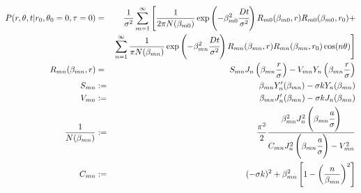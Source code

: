 \documentclass{article}
\begin{document}
\begin{eqnarray}
    P(r, \theta, t | r_0, \theta_0 = 0, \tau = 0) &=& \frac{1}{\sigma^2}
    \sum_{m=1}^{\infty}\Bigg[
        \frac{1}{2\pi N(\beta_{m0})}
        \exp\left(-\beta_{m0}^2\cfrac{D t}{\sigma^2}\right)
        R_{m0}(\beta_{m0}, r) R_{m0}(\beta_{m0}, r_0) +
        \nonumber\\
        & &\sum_{n=1}^{\infty} \frac{1}{\pi N(\beta_{mn})}
        \exp\left(-\beta_{mn}^2\cfrac{D t}{\sigma^2}\right)
        R_{mn}(\beta_{mn}, r) R_{mn}(\beta_{mn}, r_0)\cos(n\theta) \Bigg] \\
    R_{mn}(\beta_{mn}, r) &=& S_{mn}J_n\left(\beta_{mn} \frac{r}{\sigma}\right) -
                              V_{mn}Y_n\left(\beta_{mn} \frac{r}{\sigma}\right) \\
    S_{mn} &:=& \beta_{mn}Y'_n(\beta_{mn}) - \sigma kY_n(\beta_{mn}) \\
    V_{mn} &:=& \beta_{mn}J'_n(\beta_{mn}) - \sigma kJ_n(\beta_{mn}) \\
    \frac{1}{N(\beta_{mn})} &:=& \frac{\pi^2}{2}
        \frac{\beta_{mn}^2 J^2_n\left(\beta_{mn}\cfrac{a}{\sigma}\right)}
             {C_{mn} J_n^2\left(\beta_{mn}\cfrac{a}{\sigma}\right) - V_{mn}^2} \\
    C_{mn} &:=& (-\sigma k)^2 + \beta_{mn}^2 \left[1 - \left(\frac{n}{\beta_{mn}}\right)^2\right]
\end{eqnarray}
\end{document}
